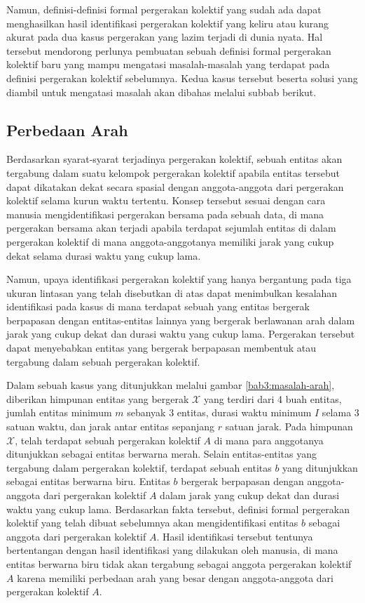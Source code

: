 Namun, definisi-definisi formal pergerakan kolektif yang sudah ada dapat menghasilkan hasil identifikasi pergerakan kolektif yang keliru atau kurang akurat pada dua kasus pergerakan yang lazim terjadi di dunia nyata. Hal tersebut mendorong perlunya pembuatan sebuah definisi formal pergerakan kolektif baru yang mampu mengatasi masalah-masalah yang terdapat pada definisi pergerakan kolektif sebelumnya. Kedua kasus tersebut beserta solusi yang diambil untuk mengatasi masalah akan dibahas melalui subbab berikut.

\subsection{Perbedaan Arah}
\label{subsec:beda-arah}
    
Berdasarkan syarat-syarat terjadinya pergerakan kolektif, sebuah entitas akan tergabung dalam suatu kelompok pergerakan kolektif apabila entitas tersebut dapat dikatakan dekat secara spasial dengan anggota-anggota dari pergerakan kolektif selama kurun waktu tertentu. Konsep tersebut sesuai dengan cara manusia mengidentifikasi pergerakan bersama pada sebuah data, di mana pergerakan bersama akan terjadi apabila terdapat sejumlah entitas di dalam pergerakan kolektif di mana anggota-anggotanya memiliki jarak yang cukup dekat selama durasi waktu yang cukup lama.

Namun, upaya identifikasi pergerakan kolektif yang hanya bergantung pada tiga ukuran lintasan yang telah disebutkan di atas dapat menimbulkan kesalahan identifikasi pada kasus di mana terdapat sebuah yang entitas bergerak berpapasan dengan entitas-entitas lainnya yang bergerak berlawanan arah dalam jarak yang cukup dekat dan durasi waktu yang cukup lama. Pergerakan tersebut dapat menyebabkan entitas yang bergerak berpapasan membentuk atau tergabung dalam sebuah pergerakan kolektif.
    
Dalam sebuah kasus yang ditunjukkan melalui gambar \ref{bab3:masalah-arah}, diberikan himpunan entitas yang bergerak $\mathcal{X}$ yang terdiri dari 4 buah entitas, jumlah entitas minimum $m$ sebanyak $3$ entitas, durasi waktu minimum $I$ selama $3$ satuan waktu, dan jarak antar entitas sepanjang $r$ satuan jarak. Pada himpunan $\mathcal{X}$, telah terdapat sebuah pergerakan kolektif $A$ di mana para anggotanya ditunjukkan sebagai entitas berwarna merah. Selain entitas-entitas yang tergabung dalam pergerakan kolektif, terdapat sebuah entitas $b$ yang ditunjukkan sebagai entitas berwarna biru. Entitas $b$ bergerak berpapasan dengan anggota-anggota dari pergerakan kolektif $A$ dalam jarak yang cukup dekat dan durasi waktu yang cukup lama. Berdasarkan fakta tersebut, definisi formal pergerakan kolektif yang telah dibuat sebelumnya akan mengidentifikasi entitas $b$ sebagai anggota dari pergerakan kolektif $A$. Hasil identifikasi tersebut tentunya bertentangan dengan hasil identifikasi yang dilakukan oleh manusia, di mana entitas berwarna biru tidak akan tergabung sebagai anggota pergerakan kolektif $A$ karena memiliki perbedaan arah yang besar dengan anggota-anggota dari pergerakan kolektif $A$.

